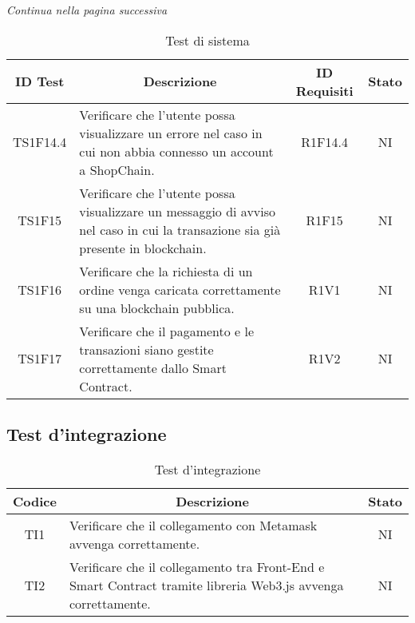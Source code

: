 \begin{center}
  \textit{\small Continua nella pagina successiva}
\end{center}
\begin{table}[H]
  \centering
  \renewcommand{\arraystretch}{1.8}
  \begin{tabular}{c|p{8cm}|c|c}
    \rowcolor[HTML]{125E28}
    \color[HTML]{FFFFFF}\textbf{ID Test}
           & \multicolumn{1}{c}{\color[HTML]{FFFFFF}\textbf{Descrizione}}
           & \color[HTML]{FFFFFF}\textbf{ID Requisiti}
           & \color[HTML]{FFFFFF}\textbf{Stato}                                                                                      \\
    \hline
    TS1F14.4 & Verificare che l'utente possa visualizzare un errore nel caso in cui non abbia connesso un account a ShopChain.  & R1F14.4 & NI \\
    TS1F15 & Verificare che l'utente possa visualizzare un messaggio di avviso nel caso in cui la transazione sia già presente in blockchain\glo{}.  & R1F15 & NI \\
    TS1F16 & Verificare che la richiesta di un ordine venga caricata correttamente su una blockchain\glo{} pubblica.                  & R1V1  & NI \\
    TS1F17 & Verificare che il pagamento e le transazioni siano gestite correttamente dallo Smart Contract\glo{}.                     & R1V2  & NI \\
  \end{tabular}
  \caption{Test di sistema}
\end{table}

\subsection{Test d'integrazione}\label{subsection:test_integrazione}
\begin{table}[H]
  \centering
  \renewcommand{\arraystretch}{1.8}
  \begin{tabular}{c|p{8cm}|c}
    \rowcolor[HTML]{125E28}
    \color[HTML]{FFFFFF}\textbf{Codice}
        & \multicolumn{1}{c}{\color[HTML]{FFFFFF}\textbf{Descrizione}}
        & \color[HTML]{FFFFFF}\textbf{Stato}                                                                                       \\
    \hline
    TI1 & Verificare che il collegamento con Metamask\glo{} avvenga correttamente.                                                  & NI \\
    TI2 & Verificare che il collegamento tra Front-End\glo{} e Smart Contract\glo{} tramite libreria Web3.js\glo{} avvenga correttamente. & NI \\
  \end{tabular}
  \caption{Test d'integrazione}
\end{table}

